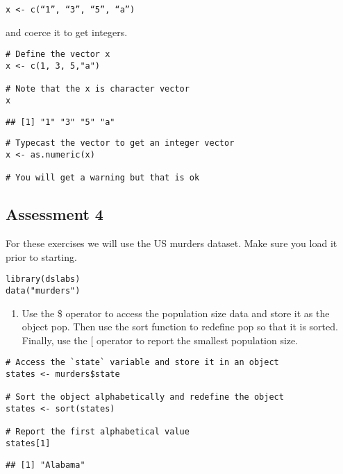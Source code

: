 \documentclass[
]{article}
\providecommand{\tightlist}{%
  \setlength{\itemsep}{0pt}\setlength{\parskip}{0pt}}
\begin{document}
\begin{verbatim}
x <- c(“1”, “3”, “5”, “a”)
\end{verbatim}

and coerce it to get integers.

\begin{verbatim}
# Define the vector x
x <- c(1, 3, 5,"a")

# Note that the x is character vector
x
\end{verbatim}

\begin{verbatim}
## [1] "1" "3" "5" "a"
\end{verbatim}

\begin{verbatim}
# Typecast the vector to get an integer vector
x <- as.numeric(x)

# You will get a warning but that is ok
\end{verbatim}

\hypertarget{assessment-4}{%
\subsection{Assessment 4}\label{assessment-4}}

For these exercises we will use the US murders dataset. Make sure you
load it prior to starting.

\begin{verbatim}
library(dslabs)
data("murders")
\end{verbatim}

\begin{enumerate}
\def\labelenumi{\arabic{enumi}.}
\tightlist
\item
  Use the \$ operator to access the population size data and store it as
  the object pop. Then use the sort function to redefine pop so that it
  is sorted. Finally, use the {[} operator to report the smallest
  population size.
\end{enumerate}

\begin{verbatim}
# Access the `state` variable and store it in an object 
states <- murders$state 

# Sort the object alphabetically and redefine the object 
states <- sort(states) 

# Report the first alphabetical value  
states[1]
\end{verbatim}

\begin{verbatim}
## [1] "Alabama"
\end{verbatim}
\end{document}
